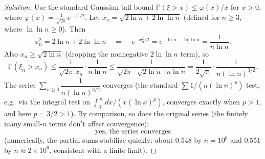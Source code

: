\documentclass[11pt]{article}
\theoremstyle{definition}
\begin{document}
\begin{proof}[Solution]
Use the standard Gaussian tail bound $\mathbb P(\xi>x)\le \varphi(x)/x$ for $x>0$, where $\varphi(x)=\frac1{\sqrt{2\pi}}e^{-x^2/2}$. Let $x_n=\sqrt{2\ln n+2\ln\ln n}$ (defined for $n\ge3$, where $\ln\ln n\ge0$). Then
\[
x_n^2 = 2\ln n+2\ln\ln n \quad\Longrightarrow\quad e^{-x_n^2/2}=e^{-\ln n-\ln\ln n}=\frac1{n\ln n}.
\]
Also $x_n\ge\sqrt{2\ln n}$ (dropping the nonnegative $2\ln\ln n$ term), so
\[
\mathbb P(\xi_n>x_n)\le \frac{1}{\sqrt{2\pi}\,x_n}\cdot\frac1{n\ln n} \le \frac{1}{\sqrt{2\pi}\cdot\sqrt{2\ln n}\cdot n\ln n} = \frac{1}{2\sqrt\pi}\cdot\frac{1}{n(\ln n)^{3/2}}.
\]
The series $\sum_{n\ge3} \dfrac1{n(\ln n)^{3/2}}$ converges (the standard $\sum 1/(n(\ln n)^p)$ test, e.g.\ via the integral test on $\int_3^\infty dx/(x(\ln x)^p)$, converges exactly when $p>1$, and here $p=3/2>1$). By comparison, so does the original series (the finitely many small-$n$ terms don't affect convergence):
\[
\boxed{\text{yes, the series converges}}
\]
(numerically, the partial sums stabilize quickly: about $0.548$ by $n=10^6$ and $0.551$ by $n\approx2\times10^6$, consistent with a finite limit).
\end{proof}
\end{document}
